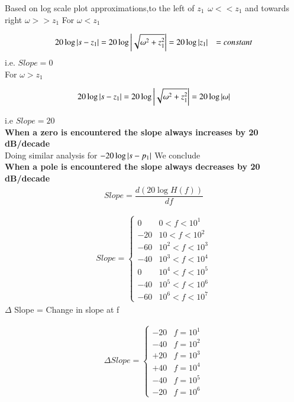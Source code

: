 \begin{enumerate}[label=\thesection.\arabic*.,ref=\thesection.\theenumi]
Based on log scale plot approximations,to the 
left of $z_{1} \hspace{5pt} \omega << z_{1} $ and towards right  $ \omega >> z_{1} $
For $\omega < z_{1}$

\begin{align}
	20\log \left\vert s-z_{1}\right\vert = 20\log \left\vert\sqrt{\omega^{2} + z_{1}^{2}}\right\vert 
	&= 20 \log \left\vert z_{1}\right\vert 
	&= constant 
\end{align}  
i.e. $Slope = 0$
\\
For $\omega > z_{1}$

\begin{align}
	20\log \left\vert s-z_{1}\right\vert = 20\log \left\vert\sqrt{\omega^{2} + z_{1}^{2}}\right\vert = 20 \log \left\vert\omega\right\vert 
\end{align}

i.e $Slope = 20 $
\\
\textbf{When a zero is encountered the slope always increases by 20 dB/decade}
\\
Doing similar analysis for $ - 20\log \left\vert s-p_{1}\right\vert $  We conclude
\\
\textbf{When a pole is encountered the slope always decreases by 20 dB/decade}
\\

\begin{align}
Slope = \dfrac{d(20\log H(f))}{df}
\end{align}

\begin{align}
 Slope = 
 \begin{cases} 
        0 & 0 < f < 10^{1} \\
      -20 & 10 < f < 10^{2} \\
      -60 & 10^{2} < f < 10^{3} \\
      -40 & 10^{3} < f < 10^{4} \\
       0 & 10^{4} < f < 10^{5} \\
      -40 & 10^{5} < f < 10^{6} \\
      -60 & 10^{6} < f < 10^{7}   
 \end{cases}
\end{align}
$ \Delta$ Slope = Change in slope at f

\begin{align}
 \Delta Slope = 
 \begin{cases} 
      -20 &  f = 10^{1} \\
      -40 &  f = 10^{2} \\
      +20 &  f = 10^{3} \\
      +40 &  f = 10^{4} \\
      -40 &  f = 10^{5} \\
      -20 &  f = 10^{6} 
 \end{cases}
\end{align}


\end{enumerate}
